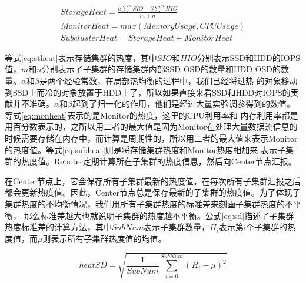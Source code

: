 


\begin{eqnarray}
    \displaystyle  StorageHeat = \frac{\alpha \sum^n SIO + \beta \sum^m HIO}{m+n} \label{eq:stheat}\\
    \displaystyle  MonitorHeat = max(MemoryUsage, CPUUsage) \label{eq:monheat}  \\
    \displaystyle  SubclusterHeat = StorageHeat + MonitorHeat
    \label{eq:subheat}
    \end{eqnarray}

等式\ref{eq:stheat}表示存储集群的热度，其中$SIO$和$HIO$分别表示SSD和HDD的IOPS值，$m$和$n$分别表示了子集群的存储集群内部SSD OSD的数量和HDD OSD的数量。$\alpha$和$\beta$是两个经验常数，在局部热均衡的过程中，我们已经将过热
的对象移动到SSD上而冷的对象放置于HDD上了，所以如果直接来看SSD和HDD对IOPS的贡献并不准确。$\alpha$和$\beta$起到了归一化的作用，他们是经过大量实验调参得到的数值。等式\ref{eq:monheat}表示的是Monitor的热度，这里的CPU利用率和
内存利用率都是用百分数表示的，之所以用二者的最大值是因为Monitor在处理大量数据流信息的时候需要存储在内存中，而计算是周期性的，所以用二者的最大值来表示Monitor的热度值。等式\ref{eq:subheat}则是将存储集群热度和Monitor热度相加来
表示子集群的热度值。Repoter定期计算所在子集群的热度信息，然后向Center节点汇报。

在Center节点上，它会保存所有子集群最新的热度值，在每次所有子集群汇报之后都会更新热度值。因此，Center节点总是保存最新的子集群的热度值。为了体现子集群热度的不均衡情况，我们用所有子集群热度的标准差来刻画子集群热度的不平衡，
那么标准差越大也就说明子集群的热度越不平衡。公式\ref{eq:sd}描述了子集群热度标准差的计算方法，其中$SubNum$表示子集群数量，$H_i$表示第i个子集群的热度值，而$\mu$则表示所有子集群热度值的均值。

\begin{equation}
    \label{eq:sd}
    heatSD = \sqrt{\frac{1}{SubNum} \sum_{i=0}^{SubNum} (H_i - \mu)^2}
\end{equation}

